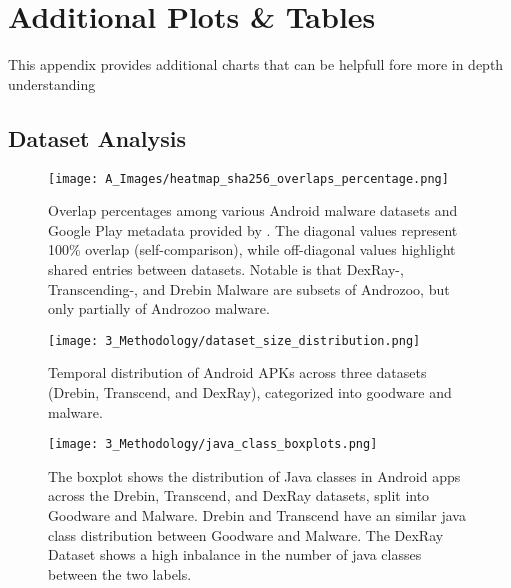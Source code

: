  
\chapter{Additional Plots \& Tables}
\label{sec:appendiximages}

This appendix provides additional charts that can be helpfull fore more in depth understanding

\section{Dataset Analysis}\label{AppendixDatasetAnalysis}

\begin{figure*}[htb]
    \centering
    \begin{minipage}{1.5\textwidth}
        \centering
        \texttt{[image: A\_Images/heatmap\_sha256\_overlaps\_percentage.png]}
        \captionsetup{width=\textwidth}
        \caption{\label{fig:dataset_overlap}
        Overlap percentages among various Android malware datasets and Google Play metadata provided by \cite{gp_metadata}. 
        The diagonal values represent 100\% overlap (self-comparison), 
        while off-diagonal values highlight shared entries between datasets.
        Notable is that DexRay-, Transcending-, and Drebin Malware are subsets of Androzoo,
        but only partially of Androzoo malware.
        }
    \end{minipage}
\end{figure*}

\newpage

\begin{figure*}[h]
    \centering
    \texttt{[image: 3\_Methodology/dataset\_size\_distribution.png]}
    \caption{\label{fig:dataset_size_evaluation}
    Temporal distribution of Android APKs across three datasets (Drebin, Transcend, and DexRay), 
    categorized into goodware and malware.}
\end{figure*}



\begin{figure*}[b!]
    \centering
    \begin{minipage}{1.5\textwidth}
        \centering
        \texttt{[image: 3\_Methodology/java\_class\_boxplots.png]}
        \captionsetup{width=\textwidth}
        \caption{\label{fig:java_class_boxplots}
        The boxplot shows the distribution of Java classes in Android apps 
        across the Drebin, Transcend, and DexRay datasets, 
        split into Goodware and Malware. 
        Drebin and Transcend have an similar java class distribution 
        between Goodware and Malware.
        The DexRay Dataset shows a high inbalance in the number of java classes 
        between the two labels.
        }
    \end{minipage}
\end{figure*}

